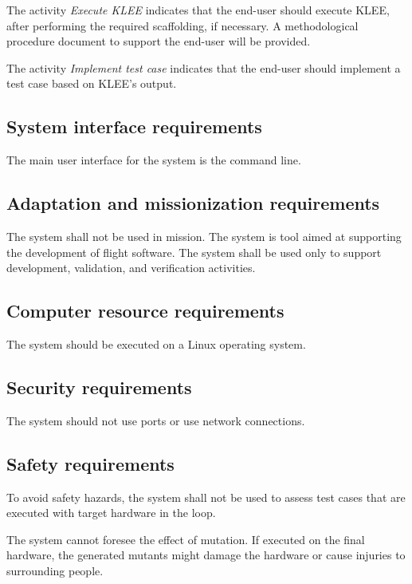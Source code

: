 \RQ{} The activity \emph{Execute KLEE} indicates that the end-user should execute KLEE, after performing the required scaffolding, if necessary. A methodological procedure document to support the end-user will be provided.

\RQ{} The activity \emph{Implement test case} indicates that the end-user should implement a test case based on KLEE's output.

\subsection{System interface requirements}

\RQ{} The main user interface for the system is the command line.

\subsection{Adaptation and missionization requirements }

\RQ{} The system shall not be used in mission. The system is tool aimed at supporting the development of flight software. The system shall be used only to support development, validation, and verification activities. 

\subsection{Computer resource requirements}

\RQ{} The system should be executed on a Linux operating system.

\subsection{Security requirements }

\RQ{} The system should not use ports or use network connections.


\subsection{Safety requirements}

\RQ{} To avoid safety hazards, the system shall not be used to assess test cases that are executed with target hardware in the loop.

\RQ{} The system cannot foresee the effect of mutation. If executed on the final hardware, the generated mutants might damage the hardware or cause injuries to surrounding people.

